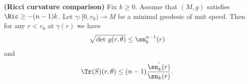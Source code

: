 %
\begin{theorem}
\label{thm:ricci-curvature-comparison}
\label{riccurvcomp}
\leanok
{\bf (Ricci curvature comparison)} Fix $k\ge 0$. Assume that $(M,
g)$ satisfies $\Ric \geq -(n-1)k$. Let $\gamma\colon [0,r_0)\to
M$ be a minimal geodesic of unit speed. Then for any $r<r_0$ at
$\gamma(r)$ we have
$$\sqrt{\det\, g(r,\theta)} \leq \sn^{n-1}_{k}(r)$$ and
$$\Tr(S)(r,\theta) \leq (n-1)\frac{\sn_{k}^{'}(r)}{\sn_{k}(r)}.$$
\end{theorem}


